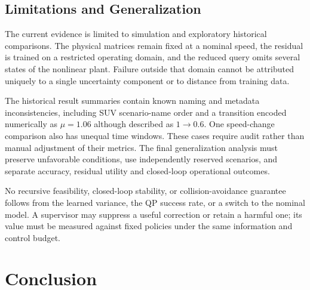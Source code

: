 \documentclass[10pt,journal]{IEEEtran}
\begin{document}
\subsection{Limitations and Generalization}
The current evidence is limited to simulation and exploratory historical comparisons. The physical matrices remain fixed at a nominal speed, the residual is trained on a restricted operating domain, and the reduced query omits several states of the nonlinear plant. Failure outside that domain cannot be attributed uniquely to a single uncertainty component or to distance from training data.

The historical result summaries contain known naming and metadata inconsistencies, including SUV scenario-name order and a transition encoded numerically as $\mu=1.06$ although described as $1\rightarrow0.6$. One speed-change comparison also has unequal time windows. These cases require audit rather than manual adjustment of their metrics. The final generalization analysis must preserve unfavorable conditions, use independently reserved scenarios, and separate accuracy, residual utility and closed-loop operational outcomes.

No recursive feasibility, closed-loop stability, or collision-avoidance guarantee follows from the learned variance, the QP success rate, or a switch to the nominal model. A supervisor may suppress a useful correction or retain a harmful one; its value must be measured against fixed policies under the same information and control budget.

\section{Conclusion}
\label{sec:conclusion}

\end{document}
